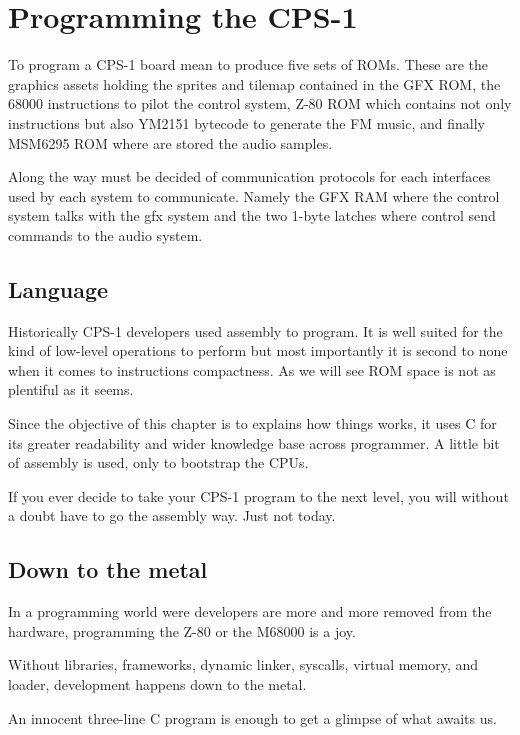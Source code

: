 \chapter{Programming the CPS-1}

To program a CPS-1 board mean to produce five sets of ROMs. These are the graphics assets holding the sprites and tilemap contained in the GFX ROM, the 68000 instructions to pilot the control system, Z-80 ROM which contains not only instructions but also YM2151 bytecode to generate the FM music, and finally MSM6295 ROM where are stored the audio samples.


Along the way must be decided of communication protocols for each interfaces used by each system to communicate. Namely the GFX RAM where the control system talks with the gfx system and the two 1-byte latches where control send commands to the audio system.


\section{Language}
Historically CPS-1 developers used assembly to program. It is well suited for the kind of low-level operations to perform but most importantly it is second to none when it comes to instructions compactness. As we will see ROM space is not as plentiful as it seems.

Since the objective of this chapter is to explains how things works, it uses C for its greater readability and wider knowledge base across programmer. A little bit of assembly is used, only to bootstrap the CPUs.

If you ever decide to take your CPS-1 program to the next level, you will without a doubt have to go the assembly way. Just not today.

\section{Down to the metal}
In a programming world were developers are more and more removed from the hardware, programming the Z-80 or the M68000 is a joy.

Without libraries, frameworks, dynamic linker, syscalls, virtual memory, and loader, development happens down to the metal.

An innocent three-line C program is enough to get a glimpse of what awaits us.



